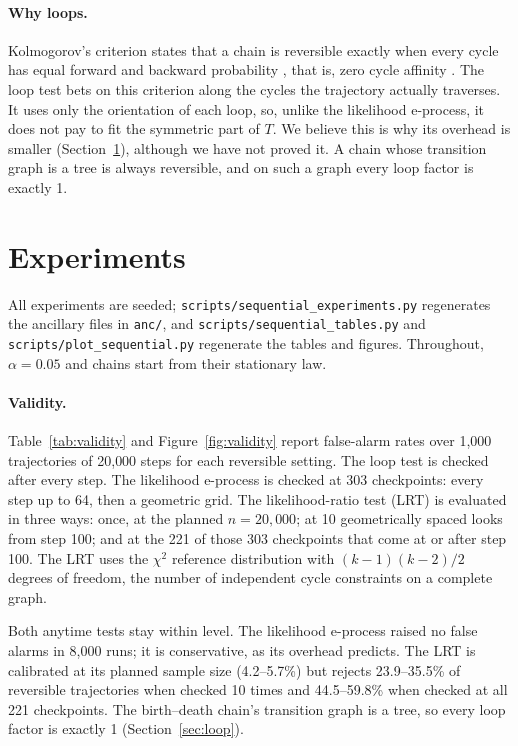\documentclass[11pt]{article}
\theoremstyle{definition}
\theoremstyle{remark}
\begin{document}
\paragraph{Why loops.} Kolmogorov's criterion states that a chain is reversible exactly when every cycle has equal forward and backward probability \cite{kelly1979}, that is, zero cycle affinity \cite{pietzonka2021}. The loop test bets on this criterion along the cycles the trajectory actually traverses. It uses only the orientation of each loop, so, unlike the likelihood e-process, it does not pay to fit the symmetric part of $T$. We believe this is why its overhead is smaller (Section~\ref{sec:experiments}), although we have not proved it. A chain whose transition graph is a tree is always reversible, and on such a graph every loop factor is exactly 1.

\section{Experiments}\label{sec:experiments}

All experiments are seeded; \texttt{scripts/sequential\_experiments.py} regenerates the ancillary files in \texttt{anc/}, and \texttt{scripts/sequential\_tables.py} and \texttt{scripts/plot\_sequential.py} regenerate the tables and figures. Throughout, $\alpha=0.05$ and chains start from their stationary law.

\paragraph{Validity.} Table~\ref{tab:validity} and Figure~\ref{fig:validity} report false-alarm rates over 1{,}000 trajectories of 20{,}000 steps for each reversible setting. The loop test is checked after every step. The likelihood e-process is checked at 303 checkpoints: every step up to 64, then a geometric grid. The likelihood-ratio test (LRT) is evaluated in three ways: once, at the planned $n=20{,}000$; at 10 geometrically spaced looks from step 100; and at the 221 of those 303 checkpoints that come at or after step 100. The LRT uses the $\chi^2$ reference distribution with $(k-1)(k-2)/2$ degrees of freedom, the number of independent cycle constraints on a complete graph.

Both anytime tests stay within level. The likelihood e-process raised no false alarms in 8{,}000 runs; it is conservative, as its overhead predicts. The LRT is calibrated at its planned sample size (4.2--5.7\%) but rejects 23.9--35.5\% of reversible trajectories when checked 10 times and 44.5--59.8\% when checked at all 221 checkpoints. The birth--death chain's transition graph is a tree, so every loop factor is exactly 1 (Section~\ref{sec:loop}).
\end{document}
